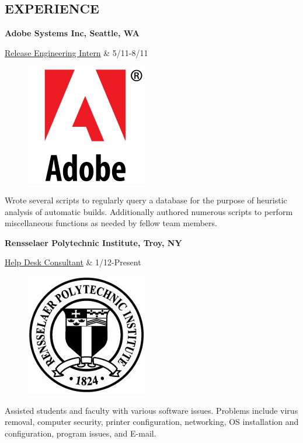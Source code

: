\documentclass[margin,11pt]{res} %
\begin{document}
\begin{resume}
\section{EXPERIENCE}     {\bf Adobe Systems Inc, Seattle, WA}  \\
                \begin{ncolumn}{2} %
                  \underline{Release Engineering Intern}     &      5/11-8/11
                \end{ncolumn}

\begin{figure} %
\centering
\hspace{-1.1in}\includegraphics[scale=0.15]{adobe.png}
\end{figure}
              Wrote several scripts to regularly query a database for the purpose of heuristic analysis of automatic builds. Additionally authored numerous scripts to perform miscellaneous functions as needed by fellow team members.      

                {\bf Rensselaer Polytechnic Institute, Troy, NY} \\
                \begin{ncolumn}{2}
                  \underline{Help Desk Consultant}     &      1/12-Present
                \end{ncolumn}

\begin{figure}
\centering
\hspace{-1in}\includegraphics[scale=0.25]{rpi.png}
\end{figure}
                Assisted students and faculty with various software issues. Problems include virus removal, computer security, printer configuration, networking, OS installation and configuration, program issues, and E-mail.
\end{resume} 
\end{document}
